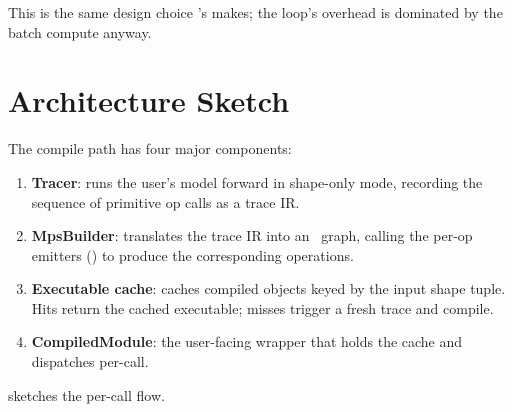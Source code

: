 This is the same design choice 's
 makes; the loop's overhead is dominated by
the batch compute anyway.

\section{Architecture Sketch}
\label{sec:compile_design:architecture}

The compile path has four major components:

\begin{enumerate}
  \item \textbf{Tracer}: runs the user's model forward in
    shape-only mode, recording the sequence of primitive op
    calls as a trace IR.
  \item \textbf{MpsBuilder}: translates the trace IR into an
    \MPSGraph\ graph, calling the per-op emitters
    () to produce the corresponding
     operations.
  \item \textbf{Executable cache}: caches compiled
     objects keyed by the input shape
    tuple. Hits return the cached executable; misses trigger a
    fresh trace and compile.
  \item \textbf{CompiledModule}: the user-facing wrapper that
    holds the cache and dispatches per-call.
\end{enumerate}

 sketches the per-call flow.

